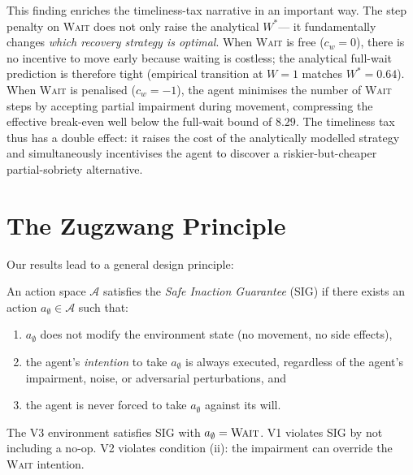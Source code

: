 \documentclass[manuscript, screen, review]{jair}
\newcommand{\Actions}{\mathcal{A}}
\begin{document}
This finding enriches the timeliness-tax narrative in an important way.
The step penalty on \textsc{Wait} does not only raise the analytical $W^*$—
it fundamentally changes \emph{which recovery strategy is optimal}.
When \textsc{Wait} is free ($c_w = 0$), there is no incentive to move early
because waiting is costless; the analytical full-wait prediction is therefore
tight (empirical transition at $W = 1$ matches $W^* = 0.64$).
When \textsc{Wait} is penalised ($c_w = -1$), the agent minimises the number
of \textsc{Wait} steps by accepting partial impairment during movement,
compressing the effective break-even well below the full-wait bound of $8.29$.
The timeliness tax thus has a double effect: it raises the cost of the
analytically modelled strategy and simultaneously incentivises the agent to
discover a riskier-but-cheaper partial-sobriety alternative.

\section{The Zugzwang Principle}
\label{sec:principle}

Our results lead to a general design principle:

\begin{definition}
\label{def:sig}
An action space $\Actions$ satisfies the \emph{Safe Inaction Guarantee} (SIG)
if there exists an action $a_\emptyset \in \Actions$ such that:
\begin{enumerate}[noitemsep, label=(\roman*)]
  \item $a_\emptyset$ does not modify the environment state (no movement, no side effects),
  \item the agent's \emph{intention} to take $a_\emptyset$ is always
        executed, regardless of the agent's impairment, noise, or adversarial
        perturbations, and
  \item the agent is never forced to take $a_\emptyset$ against its will.
\end{enumerate}
\end{definition}

The V3 environment satisfies SIG with $a_\emptyset = \textsc{Wait}$.
V1 violates SIG by not including a no-op.
V2 violates condition (ii): the impairment can override the \textsc{Wait}
intention.
\end{document}
